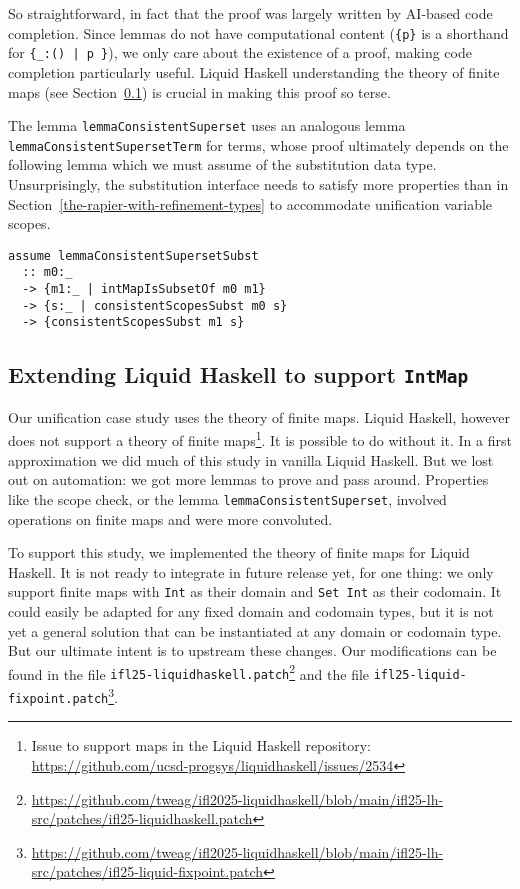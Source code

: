 \documentclass[sigconf, review]{acmart}
\newcommand{\tc}[1]{{\small\texttt{#1}}}
\newcommand{\patchfile}[1]{\tc{#1}\footnote{\scriptsize\url{https://github.com/tweag/ifl2025-liquidhaskell/blob/main/ifl25-lh-src/patches/#1}}}
\newtheorem{principle}{Principle}
\begin{document}
So straightforward, in fact that the proof was largely written by AI-based code
completion. Since lemmas do not have computational content (\tc{\{p\}} is a
shorthand for \tc{\{\_:() | p \}}), we only care about the existence of a
proof, making code completion particularly useful. Liquid Haskell understanding
the theory of finite maps (see Section~\ref{extending-liquid-haskell}) is crucial in
making this proof so terse.

The lemma \tc{lemmaConsistentSuperset} uses an analogous lemma \tc{lemma\-Consistent\-Superset\-Term} for terms,
whose proof ultimately depends on the following lemma which we must assume of the substitution data type.
Unsurprisingly, the substitution interface needs to satisfy more properties
than in Section~\ref{the-rapier-with-refinement-types} to accommodate
unification variable scopes.

\begin{verbatim}
assume lemmaConsistentSupersetSubst
  :: m0:_
  -> {m1:_ | intMapIsSubsetOf m0 m1}
  -> {s:_ | consistentScopesSubst m0 s}
  -> {consistentScopesSubst m1 s}
\end{verbatim}

\subsection{Extending Liquid Haskell to support \tc{IntMap}}
\label{extending-liquid-haskell}

Our unification case study uses the theory of finite maps. Liquid Haskell,
however does not support a theory of finite maps\footnote{Issue to support maps in
  the Liquid Haskell repository:
  \url{https://github.com/ucsd-progsys/liquidhaskell/issues/2534}}. It is
possible to do without it. In a first approximation we did much of this study in
vanilla Liquid Haskell. But we lost out on automation: we got more lemmas to prove
and pass around. Properties like the scope check, or the lemma
\tc{lemmaConsistentSuperset}, involved operations on finite maps and were more
convoluted.



To support this study, we implemented the theory of finite maps for Liquid
Haskell. It is not ready to integrate in future release yet, for one thing: we only support finite
maps with \tc{Int} as their domain and \tc{Set Int} as their codomain. It could easily be adapted for any fixed
domain and codomain types, but it is not yet a general solution that can be instantiated at any
domain or codomain type. But our ultimate intent is to upstream these changes. Our
modifications can be found in the file \patchfile{ifl25-liquidhaskell.patch} and the file \patchfile{ifl25-liquid-fixpoint.patch}.
\end{document}
